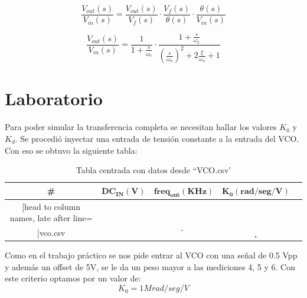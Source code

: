 \documentclass{article}
\begin{document}
\begin{equation} \label{voutvin_eqn}
\frac{V_{out}(s)}{V_{in}(s)} = \frac{V_{out}(s)}{V_f(s)} \cdot \frac{V_f(s)}{\theta(s)}\cdot \frac{\theta(s)}{V_{in}(s)}
\end{equation}

\begin{equation} \label{voutvin_eqn_posta}
\frac{V_{out}(s)}{V_{in}(s)} = \frac{1}{ 1 + \frac{s}{\omega_0}} 
\cdot \frac{ 1 + \frac{s}{\omega_2} }
{ \left(\frac{s}{\omega_n}\right)^2 + 2\frac{\xi}{\omega_n}  + 1} 
\end{equation}

\newpage

\section*{Laboratorio}
Para poder simular la transferencia completa se necesitan hallar los valores $K_0$ y $K_d$.
Se procedió inyectar una entrada de tensión constante a la entrada del VCO. Con eso se obtuvo la siguiente tabla:
\begin{table}[H]
	\centering
	\caption{Tabla centrada con datos desde ``VCO.csv'}
	\label{table7}
	\begin{tabular}{c c c c c}%
		\bfseries \# & $\bm{DC_{IN}(V)}$ & $\bm{freq_{out}(KHz)}$ & $\bm{K_0(rad/seg/V)}$  \\ \hline
		\csvreader[head to column names, late after line=\\]{vco.csv}{}{\thecsvrow & \dc & \f & \k}
		\hline
	\end{tabular}
\end{table}

Como en el trabajo práctico se nos pide entrar al VCO con una señal de 0.5 Vpp y además un offset de 5V, se le da un peso mayor a las mediciones 4, 5 y 6. Con este  criterio optamos por un valor de:
\[ K_0= 1Mrad/seg/V \]
\end{document}
